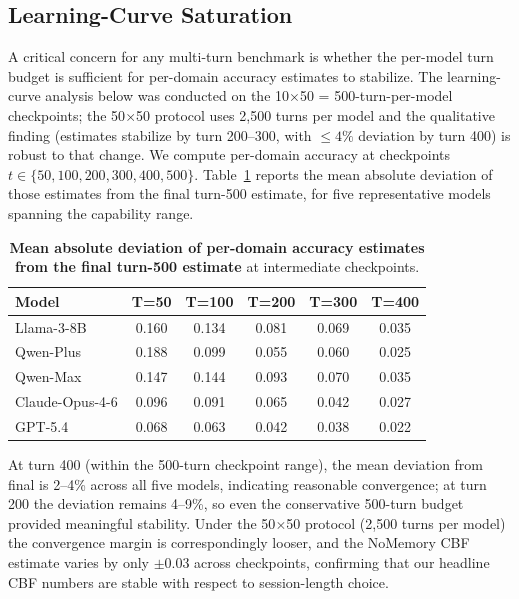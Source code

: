 \documentclass[11pt]{article}
\begin{document}


\subsection{Learning-Curve Saturation}
\label{app:lc_sat}

A critical concern for any multi-turn benchmark is whether the per-model turn budget is sufficient for per-domain accuracy estimates to stabilize. The learning-curve analysis below was conducted on the 10$\times$50 = 500-turn-per-model checkpoints; the 50$\times$50 protocol uses 2{,}500 turns per model and the qualitative finding (estimates stabilize by turn 200--300, with $\leq 4\%$ deviation by turn 400) is robust to that change. We compute per-domain accuracy at checkpoints $t \in \{50, 100, 200, 300, 400, 500\}$. Table~\ref{tab:learn_sat} reports the mean absolute deviation of those estimates from the final turn-500 estimate, for five representative models spanning the capability range.

\begin{table}[h]
\centering
\small
\caption{\textbf{Mean absolute deviation of per-domain accuracy estimates from the final turn-500 estimate} at intermediate checkpoints.}
\label{tab:learn_sat}
\begin{tabular}{lccccc}
\toprule
\textbf{Model} & \textbf{T=50} & \textbf{T=100} & \textbf{T=200} & \textbf{T=300} & \textbf{T=400} \\
\midrule
Llama-3-8B      & 0.160 & 0.134 & 0.081 & 0.069 & 0.035 \\
Qwen-Plus       & 0.188 & 0.099 & 0.055 & 0.060 & 0.025 \\
Qwen-Max        & 0.147 & 0.144 & 0.093 & 0.070 & 0.035 \\
Claude-Opus-4-6 & 0.096 & 0.091 & 0.065 & 0.042 & 0.027 \\
GPT-5.4         & 0.068 & 0.063 & 0.042 & 0.038 & 0.022 \\
\bottomrule
\end{tabular}
\end{table}

At turn 400 (within the 500-turn checkpoint range), the mean deviation from final is 2--4\% across all five models, indicating reasonable convergence; at turn 200 the deviation remains 4--9\%, so even the conservative 500-turn budget provided meaningful stability. Under the 50$\times$50 protocol (2,500 turns per model) the convergence margin is correspondingly looser, and the NoMemory CBF estimate varies by only $\pm 0.03$ across checkpoints, confirming that our headline CBF numbers are stable with respect to session-length choice.
\end{document}
